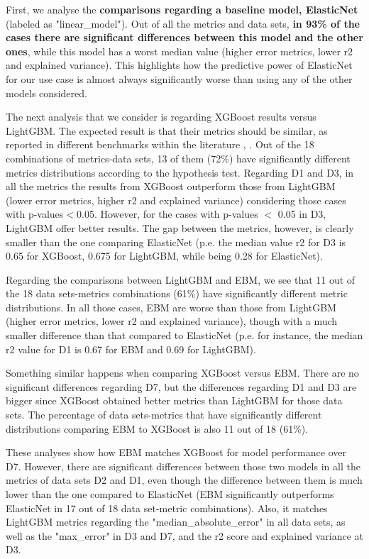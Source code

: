 First, we analyse the \textbf{comparisons regarding a baseline model, ElasticNet} (labeled as "linear\_model"). Out of all the metrics and data sets, \textbf{in 93\% of the cases there are significant differences between this model and the other ones}, while this model has a worst median value (higher error metrics, lower r2 and explained variance). This highlights how the predictive power of ElasticNet for our use case is almost always significantly worse than using any of the other models considered.

The next analysis that we consider is regarding XGBoost results versus LightGBM. The expected result is that their metrics should be similar, as reported in different benchmarks within the literature \parencite{nemeth2019comparison}, \parencite{anghel2018benchmarking}. Out of the 18 combinations of metrics-data sets, 13 of them (72\%) have significantly different metrics distributions according to the hypothesis test. Regarding D1 and D3, in all the metrics the results from XGBoost outperform those from LightGBM (lower error metrics, higher r2 and explained variance) considering those cases with p-values$<$0.05. However, for the cases with p-values $<$ 0.05 in D3, LightGBM offer better results. The gap between the metrics, however, is clearly smaller than the one comparing ElasticNet (p.e. the median value r2 for D3 is 0.65 for XGBoost, 0.675 for LightGBM, while being 0.28 for ElasticNet). 

Regarding the comparisons between LightGBM and EBM, we see that 11 out of the 18 data sets-metrics combinations (61\%) have significantly different metric distributions. In all those cases, EBM are worse than those from LightGBM (higher error metrics, lower r2 and explained variance), though with a much smaller difference than that compared to ElasticNet (p.e. for instance, the median r2 value for D1 is 0.67 for EBM and 0.69 for LightGBM).

Something similar happens when comparing XGBoost versus EBM. There are no significant differences regarding D7, but the differences regarding D1 and D3 are bigger since XGBoost obtained better metrics than LightGBM for those data sets. The percentage of data sets-metrics that have significantly different distributions comparing EBM to XGBoost is also 11 out of 18 (61\%).

These analyses show how EBM matches XGBoost for model performance over D7. However, there are significant differences between those two models in all the metrics of data sets D2 and D1, even though the difference between them is much lower than the one compared to ElasticNet (EBM significantly outperforms ElasticNet in 17 out of 18 data set-metric combinations).
Also, it matches LightGBM metrics regarding the "median\_absolute\_error" in all data sets, as well as the "max\_error" in D3 and D7, and the r2 score and explained variance at D3. 

